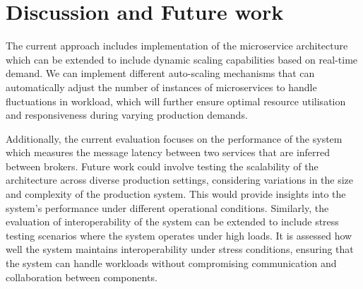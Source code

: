 \section{Discussion and Future work}

The current approach includes implementation of the microservice architecture which can be extended to include dynamic scaling capabilities based on real-time demand. We can implement different auto-scaling mechanisms that can automatically adjust the number of instances of microservices to handle fluctuations in workload, which will further ensure optimal resource utilisation and responsiveness during varying production demands. 


Additionally, the current evaluation focuses on the performance of the system which measures the message latency between two services that are inferred between brokers. Future work could involve testing the scalability of the architecture across diverse production settings, considering variations in the size and complexity of the production system. This would provide insights into the system’s performance under different operational conditions. Similarly, the evaluation of interoperability of the system can be extended to include stress testing scenarios where the system operates under high loads. It is assessed how well the system maintains interoperability under stress conditions, ensuring that the system can handle workloads without compromising communication and collaboration between components.


